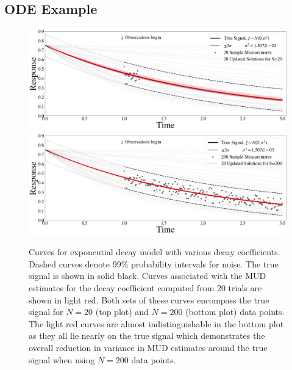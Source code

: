 \subsection{ODE Example}\label{subsec:ode-example}
\begin{figure}[htb]
  \includegraphics[width=\linewidth]{figures/ode/ode_20_reference_solution.png}
  \includegraphics[width=\linewidth]{figures/ode/ode_200_reference_solution.png}
  \caption{Curves for exponential decay model with various decay coefficients. Dashed curves denote 99\% probability intervals for noise. The true signal is shown in solid black.
 Curves associated with the MUD estimates for the decay coefficient computed from 20 trials are shown in light red.
 Both sets of these curves encompass the true signal for $N=20$ (top plot) and $N=200$ (bottom plot) data points.
 The light red curves are almost indistinguishable in the bottom plot as they all lie nearly on the true signal which demonstrates the overall reduction in variance in MUD estimates around the true signal when using $N=200$ data points.
	{
	\color{blue}{First line of legend: ``$\pm 3\sigma$ from True Signal''. Second line of legend: ``True signal''. Third line ``Measurements with $N(0,\sigma^2)$ noise''. Then, fourth line of legend: ``Signals based on $\mudpt$ estimates''. Also, make the red curves dash-dotted and less transparent so that they are easier to distinguish. Maybe use a deeper red. }
	}
  }
  \label{fig:ode-reference}
\end{figure}


